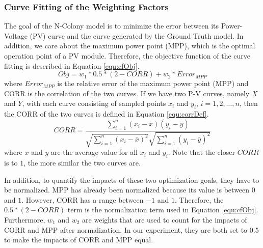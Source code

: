 \subsubsection{Curve Fitting of the Weighting Factors}
The goal of the N-Colony model is to minimize the error between its Power-Voltage (PV) curve and the curve generated by the Ground Truth model. In addition, we care about the maximum power point (MPP), which is the optimal operation point of a PV module. Therefore, the objective function of the curve fitting is described in Equation \ref{equ:cfObj}.
\begin{equation}\label{equ:cfObj}
Obj = w_1*0.5*(2-CORR)+ w_2*Error_{MPP}
\end{equation}
where $Error_{MPP}$ is the relative error of the maximum power point (MPP) and CORR is the correlation of the two curves. If we have two P-V curves, namely $X$ and $Y$, with each curve consisting of sampled points $x_i$ and $y_i$, $i=1,2,\dots,n$, then the CORR of the two curves is defined in Equation \ref{equ:corrDef}.
\begin{equation}\label{equ:corrDef}
CORR = \frac{\sum_{i=1}^n{(x_i - \bar{x})(y_i - \bar{y}) } } {\sqrt{\sum_{i=1}^n{(x_i - \bar{x})^2}}\sqrt{\sum_{i=1}^n{(y_i - \bar{y})^2}}}
\end{equation}
where $\bar{x}$ and $\bar{y}$ are the average value for all $x_i$ and $y_i$. Note that the closer $CORR$ is to $1$, the more similar the two curves are.

In addition, to quantify the impacts of these two optimization goals, they have to be normalized. MPP has already been normalized because its value is between $0$ and $1$. However, CORR has a range between $-1$ and $1$. Therefore, the $0.5*(2-CORR )$ term is the normalization term used in Equation \ref{equ:cfObj}. Furthermore, $w_1$  and $w_2$ are weights that are used to count for the impacts of CORR and MPP after normalization. In our experiment, they are both set to $0.5$ to make the impacts of CORR and MPP equal.

